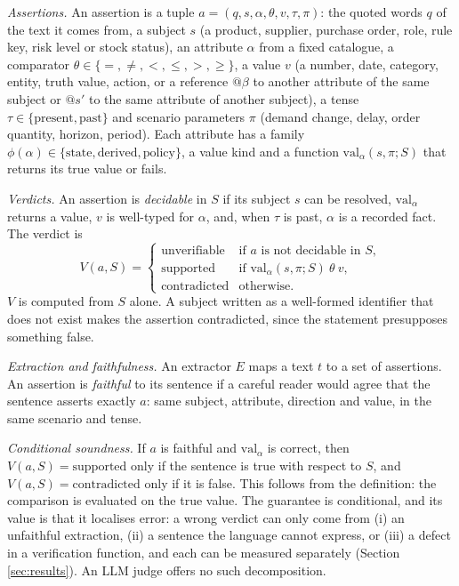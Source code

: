 \documentclass[journal]{IEEEtran}
\renewcommand{\paragraph}[1]{\par\textit{#1}\enspace}
\begin{document}
\paragraph{Assertions.} An assertion is a tuple
$a=(q, s, \alpha, \theta, v, \tau, \pi)$: the quoted words $q$ of the text it comes from, a subject $s$
(a product, supplier, purchase order, role, rule key, risk level or stock status), an attribute $\alpha$
from a fixed catalogue, a comparator $\theta\in\{=,\neq,<,\le,>,\ge\}$, a value $v$ (a number, date,
category, entity, truth value, action, or a reference $@\beta$ to another attribute of the same subject or
$@s'$ to the same attribute of another subject), a tense $\tau\in\{\text{present},\text{past}\}$ and scenario
parameters $\pi$ (demand change, delay, order quantity, horizon, period). Each attribute has a family
$\phi(\alpha)\in\{\text{state},\text{derived},\text{policy}\}$, a value kind and a function
$\mathrm{val}_\alpha(s,\pi;S)$ that returns its true value or fails.

\paragraph{Verdicts.} An assertion is \emph{decidable} in $S$ if its subject $s$ can be resolved,
$\mathrm{val}_\alpha$ returns a value, $v$ is well-typed for $\alpha$, and, when $\tau$ is past, $\alpha$ is
a recorded fact. The verdict is
\[
V(a,S)=\begin{cases}
\text{unverifiable} & \text{if } a \text{ is not decidable in } S,\\
\text{supported} & \text{if } \mathrm{val}_\alpha(s,\pi;S)\ \theta\ v,\\
\text{contradicted} & \text{otherwise.}
\end{cases}
\]
$V$ is computed from $S$ alone. A subject written as a well-formed identifier that does not exist makes the
assertion contradicted, since the statement presupposes something false.

\paragraph{Extraction and faithfulness.} An extractor $E$ maps a text $t$ to a set of assertions. An
assertion is \emph{faithful} to its sentence if a careful reader would agree that the sentence asserts
exactly $a$: same subject, attribute, direction and value, in the same scenario and tense.

\paragraph{Conditional soundness.} If $a$ is faithful and $\mathrm{val}_\alpha$ is correct, then
$V(a,S)=\text{supported}$ only if the sentence is true with respect to $S$, and
$V(a,S)=\text{contradicted}$ only if it is false. This follows from the definition: the comparison is
evaluated on the true value. The guarantee is conditional, and its value is that it localises error: a
wrong verdict can only come from (i) an unfaithful extraction, (ii) a sentence the language cannot express,
or (iii) a defect in a verification function, and each can be measured separately (Section
\ref{sec:results}). An LLM judge offers no such decomposition.
\end{document}
